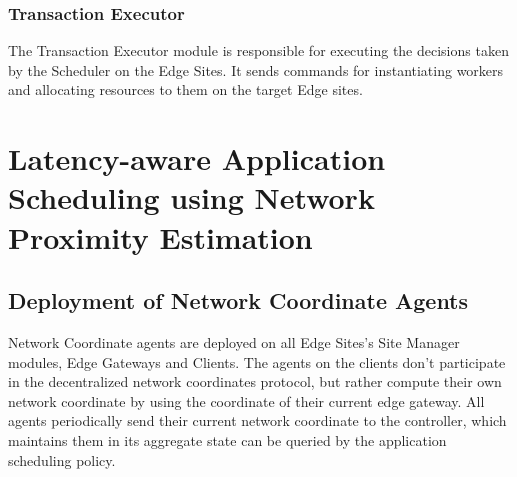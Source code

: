 \subsubsection{Transaction Executor}
The Transaction Executor module is responsible for executing the decisions taken by the Scheduler on the Edge Sites. It sends commands for instantiating workers and allocating resources to them on the target Edge sites.

\section{Latency-aware Application Scheduling using Network Proximity Estimation}

\subsection{Deployment of Network Coordinate Agents}
Network Coordinate agents are deployed on all Edge Sites's Site Manager modules, Edge Gateways and Clients. The agents on the clients don't participate in the decentralized network coordinates protocol, but rather compute their own network coordinate by using the coordinate of their current edge gateway. All agents periodically send their current network coordinate to the controller, which maintains them in its aggregate state can be queried by the application scheduling policy.

